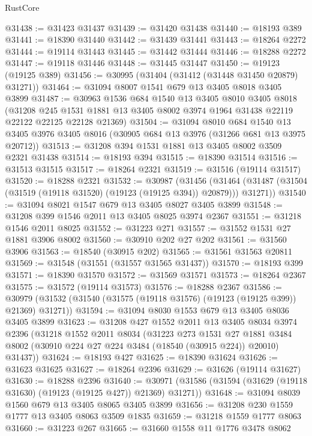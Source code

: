 \begin{lexlean}{RustCore}
\begin{coremodule}
@31438 := @31423 @31437
@31439 := @31420 @31438
@31440 := @18193 @389
@31441 := @18390 @31440
@31442 := @31439 @31441
@31443 := @18264 @2272
@31444 := @19114 @31443
@31445 := @31442 @31444
@31446 := @18288 @2272
@31447 := @19118 @31446
@31448 := @31445 @31447
@31450 := @19123 (@19125 @389)
@31456 := @30995 (@31404 (@31412 (@31448 @31450 @20879) @31271))
@31464 := @31094 @8007 @1541 @679 @13 @3405 @8018 @3405 @3899
@31487 := @30963
    @1536
    @684
    @1540
    @13
    @3405
    @8010
    @3405
    @8018
    (@31208 @245 @1531 @1881 @13 @3405 @8002 @3974 @1964 @31438 @22119 @22122 @22125 @22128 @21369)
@31504 := @31094
    @8010
    @684
    @1540
    @13
    @3405
    @3976
    @3405
    @8016
    (@30905 @684 @13 @3976 (@31266 @681 @13 @3975 @20712))
@31513 := @31208 @394 @1531 @1881 @13 @3405 @8002 @3509 @2321 @31438
@31514 := @18193 @394
@31515 := @18390 @31514
@31516 := @31513 @31515
@31517 := @18264 @2321
@31519 := @31516 (@19114 @31517)
@31520 := @18288 @2321
@31532 := @30987
    (@31456
      (@31464 (@31487 (@31504 (@31519 (@19118 @31520) (@19123 (@19125 @394)) @20879))) @31271))
@31540 := @31094 @8021 @1547 @679 @13 @3405 @8027 @3405 @3899
@31548 := @31208 @399 @1546 @2011 @13 @3405 @8025 @3974 @2367
@31551 := @31218 @1546 @2011 @8025
@31552 := @31223 @271
@31557 := @31552 @1531 @27 @1881 @3906 @8002
@31560 := @30910 @202 @27 @202
@31561 := @31560 @3906
@31563 := @18540 (@30915 @202)
@31565 := @31561 @31563 @20811
@31569 := @31548 (@31551 (@31557 @31565 @31437))
@31570 := @18193 @399
@31571 := @18390 @31570
@31572 := @31569 @31571
@31573 := @18264 @2367
@31575 := @31572 (@19114 @31573)
@31576 := @18288 @2367
@31586 := @30979 (@31532 (@31540 (@31575 (@19118 @31576) (@19123 (@19125 @399)) @21369) @31271))
@31594 := @31094 @8030 @1553 @679 @13 @3405 @8036 @3405 @3899
@31623 := @31208
    @427
    @1552
    @2011
    @13
    @3405
    @8034
    @3974
    @2396
    (@31218
      @1552
      @2011
      @8034
      (@31223
        @273
        @1531
        @27
        @1881
        @3484
        @8002
        (@30910 @224 @27 @224 @3484 (@18540 (@30915 @224)) @20010)
        @31437))
@31624 := @18193 @427
@31625 := @18390 @31624
@31626 := @31623 @31625
@31627 := @18264 @2396
@31629 := @31626 (@19114 @31627)
@31630 := @18288 @2396
@31640 := @30971 (@31586 (@31594 (@31629 (@19118 @31630) (@19123 (@19125 @427)) @21369) @31271))
@31648 := @31094 @8039 @1560 @679 @13 @3405 @8065 @3405 @3899
@31656 := @31208 @230 @1559 @1777 @13 @3405 @8063 @3509 @1835
@31659 := @31218 @1559 @1777 @8063
@31660 := @31223 @267
@31665 := @31660 @1558 @11 @1776 @3478 @8062

\end{coremodule}
\end{lexlean}
